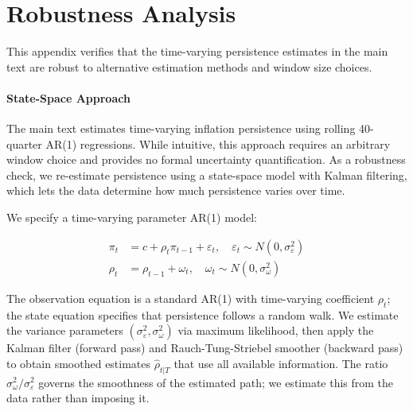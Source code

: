 \documentclass[10pt]{article}
\begin{document}

\section{Robustness Analysis}
\label{app:robustness}

This appendix verifies that the time-varying persistence estimates in the main text are robust to alternative estimation methods and window size choices.

\paragraph{State-Space Approach} The main text estimates time-varying inflation persistence using rolling 40-quarter AR(1) regressions. While intuitive, this approach requires an arbitrary window choice and provides no formal uncertainty quantification. As a robustness check, we re-estimate persistence using a state-space model with Kalman filtering, which lets the data determine how much persistence varies over time.

We specify a time-varying parameter AR(1) model:

\begin{align}
\pi_t &= c + \rho_t \pi_{t-1} + \varepsilon_t, \quad \varepsilon_t \sim N(0, \sigma^2_{\varepsilon}) \\
\rho_t &= \rho_{t-1} + \omega_t, \quad \omega_t \sim N(0, \sigma^2_{\omega})
\end{align}

The observation equation is a standard AR(1) with time-varying coefficient $\rho_t$; the state equation specifies that persistence follows a random walk. We estimate the variance parameters $(\sigma^2_{\varepsilon}, \sigma^2_{\omega})$ via maximum likelihood, then apply the Kalman filter (forward pass) and Rauch-Tung-Striebel smoother (backward pass) to obtain smoothed estimates $\hat{\rho}_{t|T}$ that use all available information. The ratio $\sigma^2_{\omega}/\sigma^2_{\varepsilon}$ governs the smoothness of the estimated path; we estimate this from the data rather than imposing it.
\end{document}
